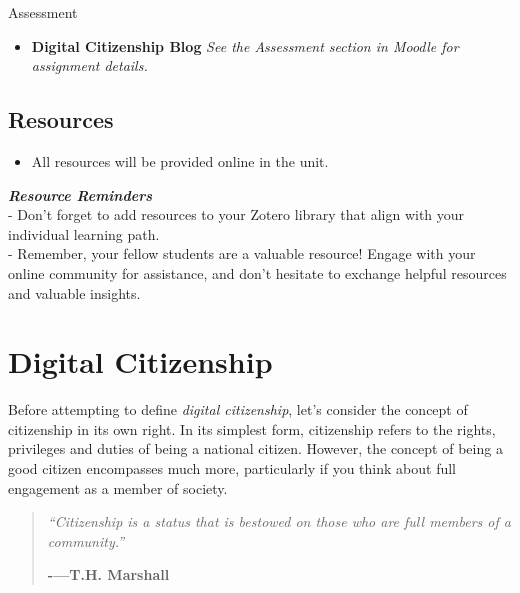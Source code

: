 \documentclass[
]{book}
\providecommand{\tightlist}{%
  \setlength{\itemsep}{0pt}\setlength{\parskip}{0pt}}
\theoremstyle{definition}
\theoremstyle{definition}
\theoremstyle{definition}
\theoremstyle{definition}
\theoremstyle{remark}
\begin{document}
\begin{assessment}
{Assessment}

\begin{itemize}
\tightlist
\item
  \textbf{Digital Citizenship Blog}
  \emph{See the Assessment section in Moodle for assignment details.}
\end{itemize}
\end{assessment}

\hypertarget{resources-4}{%
\subsection*{Resources}\label{resources-4}}

\begin{itemize}
\tightlist
\item
  All resources will be provided online in the unit.
\end{itemize}

\begin{feedback}
\textbf{\emph{Resource Reminders}}\\
- Don't forget to add resources to your Zotero library that align with
your individual learning path.\\
- Remember, your fellow students are a valuable resource! Engage with
your online community for assistance, and don't hesitate to exchange
helpful resources and valuable insights.
\end{feedback}

\hypertarget{digital-citizenship}{%
\section{Digital Citizenship}\label{digital-citizenship}}

Before attempting to define \emph{digital citizenship}, let's consider the concept of citizenship in its own right. In its simplest form, citizenship refers to the rights, privileges and duties of being a national citizen. However, the concept of being a good citizen encompasses much more, particularly if you think about full engagement as a member of society.

\begin{quote}
\emph{``Citizenship is a status that is bestowed on those who are full members of a community.''}

\textbf{-\/---T.H. Marshall}
\end{quote}
\end{document}
